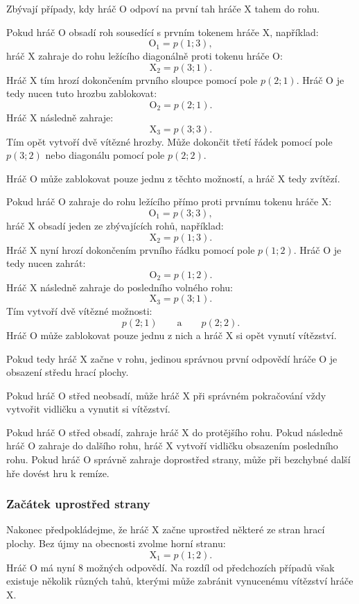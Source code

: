 \documentclass[12pt,a4paper]{article}
\begin{document}
Zbývají případy, kdy hráč $\mathrm{O}$ odpoví na první tah hráče $\mathrm{X}$ tahem do rohu.

Pokud hráč $\mathrm{O}$ obsadí roh sousedící s prvním tokenem hráče $\mathrm{X}$, například:
\[
    \mathrm{O}_1=p(1;3),
\]
hráč $\mathrm{X}$ zahraje do rohu ležícího diagonálně proti tokenu hráče $\mathrm{O}$:
\[
    \mathrm{X}_2=p(3;1).
\]
Hráč $\mathrm{X}$ tím hrozí dokončením prvního sloupce pomocí pole $p(2;1)$.
Hráč $\mathrm{O}$ je tedy nucen tuto hrozbu zablokovat:
\[
    \mathrm{O}_2=p(2;1).
\]
Hráč $\mathrm{X}$ následně zahraje:
\[
    \mathrm{X}_3=p(3;3).
\]
Tím opět vytvoří dvě vítězné hrozby.
Může dokončit třetí řádek pomocí pole $p(3;2)$ nebo diagonálu pomocí pole $p(2;2)$.

Hráč $\mathrm{O}$ může zablokovat pouze jednu z těchto možností, 
a hráč $\mathrm{X}$ tedy zvítězí.

Pokud hráč $\mathrm{O}$ zahraje do rohu ležícího přímo 
proti prvnímu tokenu hráče $\mathrm{X}$:
\[
    \mathrm{O}_1=p(3;3),
\]
hráč $\mathrm{X}$ obsadí jeden ze zbývajících rohů, například:
\[
    \mathrm{X}_2=p(1;3).
\]
Hráč $\mathrm{X}$ nyní hrozí dokončením prvního řádku pomocí pole $p(1;2)$.
Hráč $\mathrm{O}$ je tedy nucen zahrát:
\[
    \mathrm{O}_2=p(1;2).
\]
Hráč $\mathrm{X}$ následně zahraje do posledního volného rohu:
\[
    \mathrm{X}_3=p(3;1).
\]
Tím vytvoří dvě vítězné možnosti:
\[
    p(2;1)
    \qquad\text{a}\qquad
    p(2;2).
\]
Hráč $\mathrm{O}$ může zablokovat pouze jednu z nich 
a hráč $\mathrm{X}$ si opět vynutí vítězství.

Pokud tedy hráč $\mathrm{X}$ začne v rohu, 
jedinou správnou první odpovědí hráče $\mathrm{O}$ je obsazení středu hrací plochy.

Pokud hráč $\mathrm{O}$ střed neobsadí, 
může hráč $\mathrm{X}$ při správném pokračování vždy vytvořit vidličku 
a vynutit si vítězství.

Pokud hráč $\mathrm{O}$ střed obsadí, zahraje hráč $\mathrm{X}$ do protějšího rohu.
Pokud následně hráč $\mathrm{O}$ zahraje do dalšího rohu, 
hráč $\mathrm{X}$ vytvoří vidličku obsazením posledního rohu.
Pokud hráč $\mathrm{O}$ správně zahraje doprostřed strany, 
může při bezchybné další hře dovést hru k remíze.

\subsubsection*{Začátek uprostřed strany}

Nakonec předpokládejme, že hráč $\mathrm{X}$ začne uprostřed některé ze stran hrací plochy.
Bez újmy na obecnosti zvolme horní stranu:
\[
    \mathrm{X}_1=p(1;2).
\]
Hráč $\mathrm{O}$ má nyní 8 možných odpovědí. 
Na rozdíl od předchozích případů však existuje několik různých tahů, 
kterými může zabránit vynucenému vítězství hráče $\mathrm{X}$.
\end{document}
